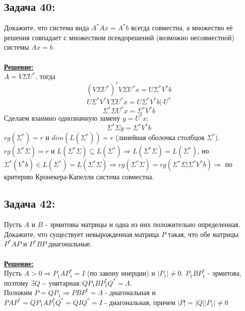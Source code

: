 \documentclass[a4paper,12pt,titlepage,final]{article}
\begin{document}
\subsection*{Задача 40:}
\noindent Докажите, что система вида $A^*Ax = A^*b$ всегда совместна, а множество её решения совпадает
с множеством псевдорешений (возможно несовместной) системы $Ax = b$. \\ \\
\textbf{\underline{Решение:}} \\
$A = V\Sigma U^*$, тогда
$$(V\Sigma U^*)^* V\Sigma U^*x = U\Sigma^*V^*b$$
$$U\Sigma^*V^*V\Sigma U^*x = U\Sigma^*V^*b | \cdot U^*$$
$$\Sigma^*\Sigma U^*x = \Sigma^*V^*b$$
Сделаем взаимно однозначную замену $y = U^*x$:
$$\Sigma^*\Sigma y = \Sigma^*V^*b$$
$rg(\Sigma^*) = r$ и $dim(L(\Sigma^*)) = r$ (линейная оболочка столбцов $\Sigma^*$). \\
$rg(\Sigma^*\Sigma) = r$ и $L(\Sigma^*\Sigma) \subseteq L(\Sigma^*) \Rightarrow L(\Sigma^*\Sigma) = L(\Sigma^*)$, но $\Sigma^*(V^*b) \in L(\Sigma^*) = L(\Sigma^*\Sigma) \Rightarrow rg(\Sigma^*\Sigma) = rg(\Sigma^*\Sigma|\Sigma^*V^*b) \Rightarrow$
по критерию Кронекера-Капелли система совместна.


\subsection*{Задача 42:}
\noindent Пусть $A$ и $B$ - эрмитовы матрицы и одна из них положительно определенная. Докажите, что существует невырожденная матрица $P$ такая, что обе матрицы $P^*AP$ и $P^*BP$ диагональные.\\ \\
\textbf{\underline{Решение:}} \\
Пусть $A > 0 \Rightarrow P_1AP^*_1 = I$ (по закону инерции) и $|P_1| \neq 0$. $P_1BP^*_1$ - эрмитова, поэтому $\exists Q - \text{унитарная}: QP_1BP^*_1Q^* = \Lambda$. \\
Положим $P = QP_1 \Rightarrow PBP^* = \Lambda$ - диагональная и $PAP^* = QP_1AP^*_1Q^* = QIQ^* = I$ - диагональная, причем $|P| = |Q||P_1| \neq 0$ \blacksquare \\ \\ \\


\end{document}
